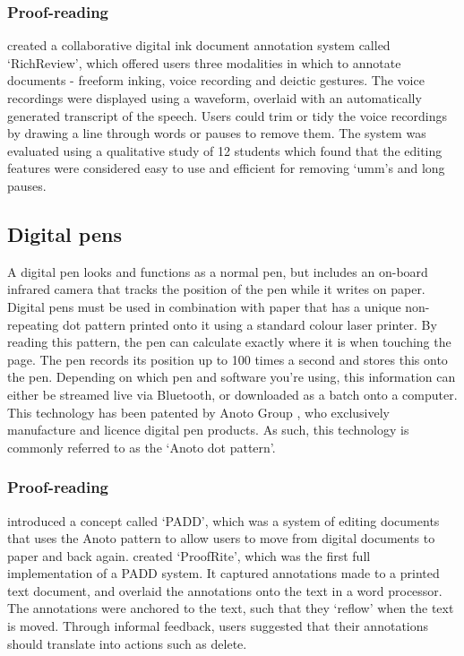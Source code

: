 \subsubsection{Proof-reading}

\citet{Yoon2014} created a collaborative digital ink document annotation system called `RichReview', which offered
users three modalities in which to annotate documents - freeform inking, voice recording and deictic gestures. The
voice recordings were displayed using a waveform, overlaid with an automatically generated transcript of the speech.
Users could trim or tidy the voice recordings by drawing a line through words or pauses to remove them.  The system was
evaluated using a qualitative study of 12 students which found that the editing features were considered easy to use
and efficient for removing `umm's and long pauses.

\subsection{Digital pens}
A digital pen looks and functions as a normal pen, but includes an on-board infrared camera that tracks the position of
the pen while it writes on paper. Digital pens must be used in combination with paper that has a unique non-repeating
dot pattern printed onto it using a standard colour laser printer.  By reading this pattern, the pen can calculate
exactly where it is when touching the page. The pen records its position up to 100 times a second and stores this onto
the pen. Depending on which pen and software you're using, this information can either be streamed live via Bluetooth,
or downloaded as a batch onto a computer. This technology has been patented by Anoto Group \citep{Fahraeus2003}, who
exclusively manufacture and licence digital pen products. As such, this technology is commonly referred to as the
`Anoto dot pattern'.


\subsubsection{Proof-reading}

\citet{Guimbretiere2003} introduced a concept called `PADD', which was a system of editing documents that uses the
Anoto pattern to allow users to move from digital documents to paper and back again. \citet{Conroy2004} created
`ProofRite', which was the first full implementation of a PADD system. It captured annotations made to a printed text
document, and overlaid the annotations onto the text in a word processor. The annotations were anchored to the text,
such that they `reflow' when the text is moved. Through informal feedback, users suggested that their annotations
should translate into actions such as delete.

